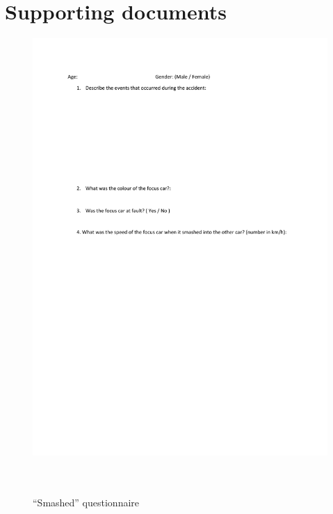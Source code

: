 \documentclass[11pt]{article}
\begin{document}
\section*{Supporting documents}
\begin{figure}[H]
  \caption{ ~\\``Smashed'' questionnaire} 
  \centering 
  \includegraphics[width=\textwidth]{smashed.pdf}
~\label{ques:smashed}
\end{figure} 
\end{document}
